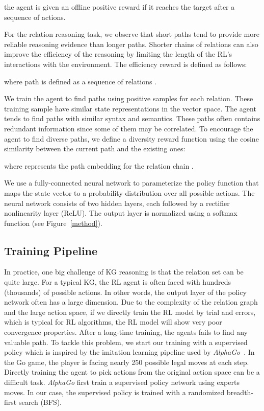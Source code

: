 \documentclass[11pt,letterpaper]{article}
\begin{document}
the agent is given an offline positive reward  if it reaches the target after a sequence of actions.

 For the relation reasoning task, we observe that short paths tend to provide more reliable reasoning evidence than longer paths. Shorter chains of relations can also improve the efficiency of the reasoning by limiting the length of the RL's interactions with the environment. The efficiency reward is defined as follows:

where path  is defined as a sequence of relations .

 We train the agent to find paths using positive samples for each relation. These training sample  have similar state representations in the vector space. The agent tends to find paths with similar syntax and semantics. These paths often contains redundant information since some of them may be correlated. To encourage the agent to find diverse paths, we define a diversity reward function using the cosine similarity between the current path and the existing ones:

where  represents the path embedding for the relation chain . 

 We use a fully-connected neural network to parameterize the policy function  that maps the state vector  to a probability distribution over all possible actions. The neural network consists of two hidden layers, each followed by a rectifier nonlinearity layer (ReLU). The output layer is normalized using a softmax function (see Figure~\ref{method}).

\subsection{Training Pipeline}
\label{subsec:train}
In practice, one big challenge of KG reasoning is that the relation set can be quite large. For a typical KG, the RL agent is often faced with hundreds (thousands) of possible actions. In other words, the output layer of the policy network often has a large dimension. Due to the complexity of the relation graph and the large action space, if we directly train the RL model by trial and errors, which is typical for RL algorithms, the RL model will show very poor convergence properties. After a long-time training, the agents fails to find any valuable path. To tackle this problem, we start our training with a supervised policy which is inspired by the  imitation learning pipeline used by {\em AlphaGo}~\cite{silver2016mastering}. In the Go game, the player is facing nearly 250 possible legal moves at each step. Directly training the agent to pick actions from the original action space can be a difficult task. {\em AlphaGo} first train a supervised policy network using experts moves. In our case, the supervised policy is trained with a randomized breadth-first search (BFS).
\end{document}
